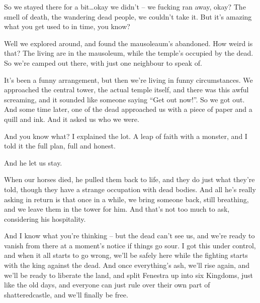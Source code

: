\begin{speechtext}
So we stayed there for a bit\ldots okay we didn't -- we fucking ran away, okay?  The smell of death, the wandering dead people, we couldn't take it.  But it's amazing what you get used to in time, you know?

Well we explored around, and found the mausoleaum's abandoned.  How weird is that?  The living are in the mausoleum, while the temple's occupied by the dead.  So we're camped out there, with just one neighbour to speak of.

It's been a funny arrangement, but then we're living in funny circumstances.  We approached the central tower, the actual temple itself, and there was this awful screaming, and it sounded like someone saying ``Get out now!''.  So we got out.  And some time later, one of the dead approached us with a piece of paper and a quill and ink.  And it asked us who we were.

And you know what?  I explained the lot.  A leap of faith with a monster, and I told it the full plan, full and honest.

And he let us stay.

When our horses died, he pulled them back to life, and they do just what they're told, though they have a strange occupation with dead bodies.  And all he's really asking in return is that once in a while, we bring someone back, still breathing, and we leave them in the tower for him.  And that's not too much to ask, considering his hospitality.

And I know what you're thinking -- but the dead can't see us, and we're ready to vanish from there at a moment's notice if things go sour.  I got this under control, and when it all starts to go wrong, we'll be safely here while the fighting starts with the king against the dead.  And once everything's ash, we'll rise again, and we'll be ready to liberate the land, and split Fenestra up into six Kingdoms, just like the old days, and everyone can just rule over their own part of \gls{shatteredcastle}, and we'll finally be free.

\end{speechtext}




